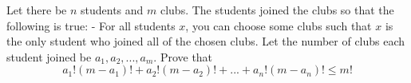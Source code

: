 Let there be $n$ students and $m$ clubs. The students joined the clubs so that the following is true:
- For all students $x$, you can choose some clubs such that $x$ is the only student who joined all of the chosen clubs.
Let the number of clubs each student joined be $a_1,a_2,...,a_m$. Prove that
$$a_1!(m - a_1)! + a_2!(m - a_2)! + ... + a_n!(m -a_n)! \le  m!$$